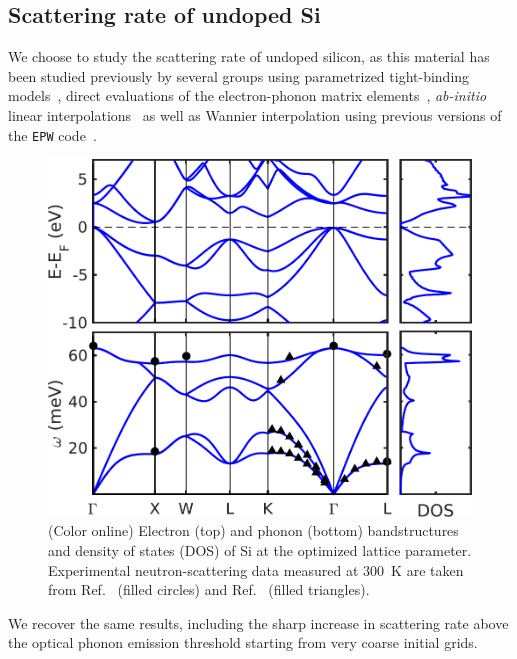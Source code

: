 \documentclass[final,3p,times,twocolumn]{elsarticle}
\begin{document}


\subsection{Scattering rate of undoped Si}

We choose to study the scattering rate of undoped silicon, as this material has been studied previously by several groups using parametrized tight-binding models~\cite{Rideau2011}, direct evaluations of the electron-phonon matrix elements~\cite{Restrepo2009,Sun2012}, \textit{ab-initio} linear interpolations~\cite{Li2015} as well as Wannier interpolation using previous versions of the \texttt{EPW} code~\cite{Bernardi2014,Qiu2015,Tandon2015}.
\begin{figure}[b!]
  \centering
  \includegraphics[width=0.95\linewidth]{Si_bandstructures2.pdf}
  \caption{\label{BS-Si} (Color online) Electron (top) and phonon (bottom) bandstructures and density of states (DOS) of Si at the optimized lattice parameter. Experimental neutron-scattering data measured at 300~K are taken from Ref.~\cite{Dolling1963} (filled circles) and Ref.~\cite{Nilsson1972} (filled triangles). }
\end{figure}%
We recover the same results, including the sharp increase in scattering rate above the optical phonon emission threshold starting from very coarse initial grids.
\end{document}
